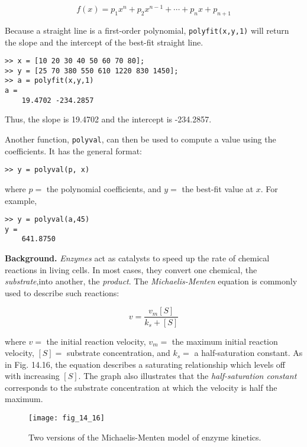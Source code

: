 \documentclass[../main.tex]{subfiles}
\begin{document}
\begin{equation}
	f(x) = p_1x^n + p_2x^{n-1} + \cdots + p_n x + p_{n + 1}
\end{equation}

Because a straight line is a first-order polynomial, \verb|polyfit(x,y,1)| will return the slope and the intercept of the best-fit straight line.

\begin{lstlisting}[numbers=none]
>> x = [10 20 30 40 50 60 70 80];
>> y = [25 70 380 550 610 1220 830 1450];
>> a = polyfit(x,y,1)
a =
	19.4702 -234.2857
\end{lstlisting}

\noindent Thus, the slope is 19.4702 and the intercept is -234.2857.

Another function, \texttt{polyval}, can then be used to compute a value using the coefficients. It has the general format:

\begin{lstlisting}[numbers=none]
>> y = polyval(p, x)
\end{lstlisting}

\noindent where $p =$ the polynomial coefficients, and $y =$ the best-fit value at $x$. For example,

\begin{lstlisting}[numbers=none]
>> y = polyval(a,45)
y =
	641.8750
\end{lstlisting}

\bigskip

\textbf{Background.} \textit{Enzymes} act as catalysts to speed up the rate of chemical reactions in living cells. In most cases, they convert one chemical, the \textit{substrate},into another, the \textit{product}. The \textit{Michaelis-Menten} equation is commonly used to describe such reactions:

\begin{equation}
	v = \frac{v_m[S]}{k_s + [S]}
\end{equation}

\noindent where $v =$ the initial reaction velocity, $v_m =$ the maximum initial reaction velocity, $[S] =$ substrate concentration, and $k_s =$ a half-saturation constant. As in Fig. 14.16, the equation describes a saturating relationship which levels off with increasing $[S]$. The graph also illustrates that the \textit{half-saturation constant} corresponds to the substrate concentration at which the velocity is half the maximum.

\begin{figure}[H] %
	\centering
	\texttt{[image: fig\_14\_16]}
	\caption{\textsf{Two versions of the Michaelis-Menten model of enzyme kinetics.}}
	\label{fig:fig_14_16}
\end{figure}
\end{document}

